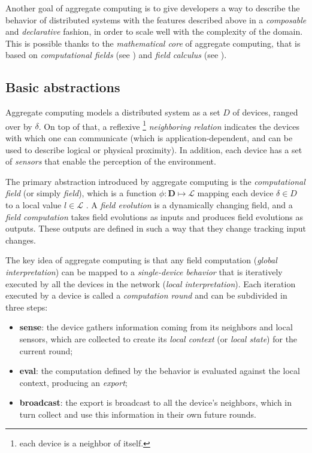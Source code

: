 Another goal of aggregate computing is to give developers a way to describe the behavior of distributed systems with the features described above in a \textit{composable} and \textit{declarative} fashion, in order to scale well with the complexity of the domain.
%
This is possible thanks to the \textit{mathematical core} of aggregate computing, that is based on \textit{computational fields} (see ) and \textit{field calculus} (see ).

\subsection{Basic abstractions}
\label{sec:ac-abstractions}

Aggregate computing models a distributed system as a set $D$ of devices, ranged over by $\delta$.
%
On top of that, a reflexive \footnote{each device is a neighbor of itself.} \textit{neighboring relation} indicates the devices with which one can communicate (which is application-dependent, and can be used to describe logical or physical proximity).
%
In addition, each device has a set of \textit{sensors} that enable the perception of the environment.

The primary abstraction introduced by aggregate computing is the \textit{computational field} (or simply \textit{field}), which is a function $\phi : \mathbf{D} \mapsto \mathcal{L}$ mapping each device $\delta \in D$ to a local value $l \in \mathcal{L}$ \cite{10.1145/3177774}.
%
A \textit{field evolution} is a dynamically changing field, and a \textit{field computation} takes field evolutions as inputs and produces field evolutions as outputs.
%
These outputs are defined in such a way that they change tracking input changes.

The key idea of aggregate computing is that any field computation (\textit{global interpretation}) can be mapped to a \textit{single-device behavior} that is iteratively executed by all the devices in the network (\textit{local interpretation}).
%
Each iteration executed by a device is called a \textit{computation round} and can be subdivided in three steps:
%
\begin{itemize}
    \item \textbf{sense}: the device gathers information coming from its neighbors and local sensors, which are collected to create its \textit{local context} (or \textit{local state}) for the current round;
    \item \textbf{eval}: the computation defined by the behavior is evaluated against the local context, producing an \textit{export};
    \item \textbf{broadcast}: the export is broadcast to all the device's neighbors, which in turn collect and use this information in their own future rounds.
\end{itemize}

